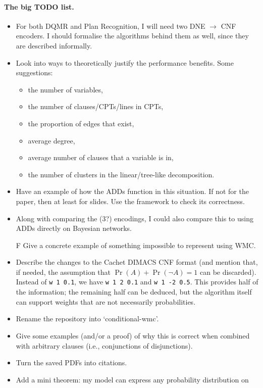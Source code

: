 \documentclass{article}
\theoremstyle{definition}
\theoremstyle{remark}
\begin{document}
\paragraph{The big TODO list.}
\begin{itemize}
\item For both DQMR and Plan Recognition, I will need two DNE $\to$ CNF
  encoders. I should formalise the algorithms behind them as well, since they
  are described informally.
\item Look into ways to theoretically justify the performance benefits. Some
  suggestions:
  \begin{itemize}
  \item the number of variables,
  \item the number of clauses/CPTs/lines in CPTs,
  \item the proportion of edges that exist,
  \item average degree,
  \item average number of clauses that a variable is in,
  \item the number of clusters in the linear/tree-like decomposition.
  \end{itemize}
\item Have an example of how the ADDs function in this situation. If not for the
  paper, then at least for slides. Use the framework to check its correctness.
\item Along with comparing the (3?) encodings, I could also compare this
  to using ADDs directly on Bayesian networks.
\item[F] Give a concrete example of something impossible to represent using WMC.
\item Describe the changes to the Cachet DIMACS CNF format (and mention that, if
  needed, the assumption that $\Pr(A) + \Pr(\neg A) = 1$ can be discarded).
  Instead of \texttt{w 1 0.1}, we have \texttt{w 1 2 0.1} and \texttt{w 1 -2
    0.5}. This provides half of the information; the remaining half can be
  deduced, but the algorithm itself can support weights that are not necessarily
  probabilities.
\item Rename the repository into `conditional-wmc'.
\item Give some examples (and/or a proof) of why this is correct when combined
  with arbitrary clauses (i.e., conjunctions of disjunctions).
\item Turn the saved PDFs into citations.
\item Add a mini theorem: my model can express any probability distribution on

\end{itemize}
\end{document}
